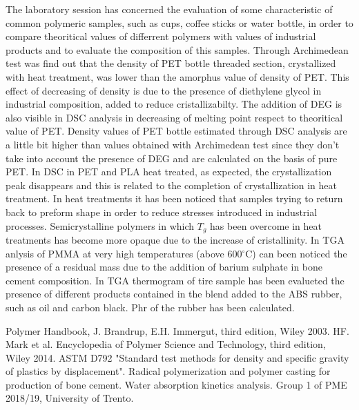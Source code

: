 \documentclass[a4paper, 11pt]{article}
\begin{document}
The laboratory session has concerned the evaluation of some characteristic of common polymeric samples, such as cups, coffee sticks or water bottle, in order to compare theoritical values of  differrent polymers with values of industrial products and  to evaluate the composition of this samples.
Through Archimedean test was find out that the density of PET bottle threaded section, crystallized with heat treatment, was lower than the amorphus value of density of PET. This effect of decreasing of density is due to the presence of diethylene glycol in industrial composition, added to reduce cristallizabilty. 
The addition of DEG is also visible in DSC analysis in decreasing of melting point respect to theoritical value of PET. Density values of PET bottle estimated through DSC analysis are a little bit higher than values obtained with Archimedean test since they don't take into account the presence of DEG and are calculated on the basis of pure PET. 
In DSC in PET and PLA heat treated, as expected, the crystallization peak disappears and this is related to the completion of crystallization in heat treatment. 
In heat treatments it has been noticed that samples trying to return back to preform shape in order to reduce stresses introduced in industrial processes. Semicrystalline polymers in which $T_g$ has been overcome in heat treatments has become more opaque due to the increase of cristallinity. 
In TGA anlysis of PMMA at very high temperatures (above  600$^\circ$C) can been noticed the presence of a residual mass due to the addition of barium sulphate in bone cement composition. In TGA thermogram of tire sample has been evalueted the presence
of different products contained in the blend added to the ABS rubber, such as oil and carbon black. Phr of the rubber has been calculated.  

\newpage
\thispagestyle{empty}

\begin{thebibliography}{1}

 Polymer Handbook, J. Brandrup, E.H. Immergut, third edition, Wiley 2003.
 HF. Mark et al. Encyclopedia of Polymer Science and Technology, third edition, Wiley 2014.
 ASTM D792 "Standard test methods for density and specific gravity of plastics by displacement".
 Radical polymerization and polymer casting for production of bone cement. Water absorption kinetics analysis. Group 1 of PME 2018/19, University of Trento. 

\end{thebibliography}
\end{document}

